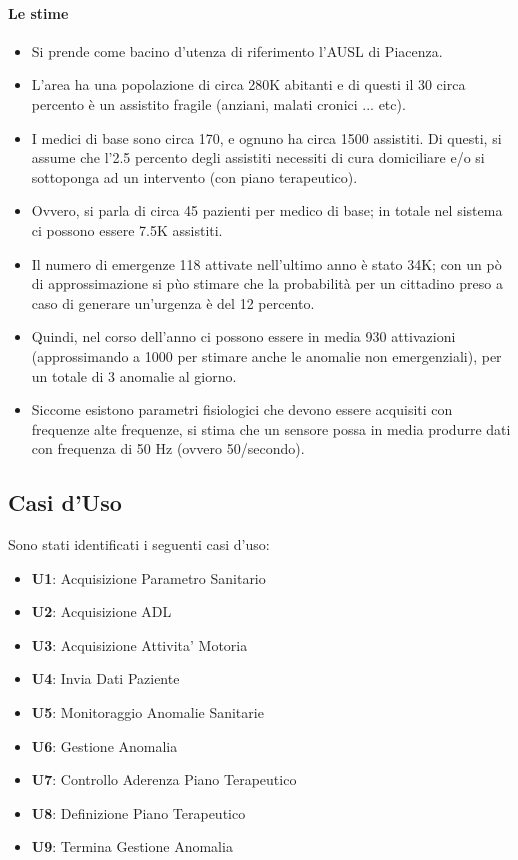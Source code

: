 \documentclass[a4paper,11pt,oneside, table]{article}
\begin{document}
\paragraph{Le stime}
\begin{itemize}
  \item Si prende come bacino d'utenza di riferimento l'AUSL di Piacenza.
  \item L'area ha una popolazione di circa 280K abitanti e di questi il 30 circa percento \`e un assistito fragile (anziani, malati cronici ... etc).
  \item I medici di base sono circa 170, e ognuno ha circa 1500 assistiti. Di questi, si assume che l'2.5 percento degli assistiti necessiti di cura domiciliare e/o si sottoponga ad un intervento (con piano terapeutico).
  \item Ovvero, si parla di circa 45 pazienti per medico di base; in totale nel sistema ci possono essere 7.5K assistiti.
  \item Il numero di emergenze 118 attivate nell'ultimo anno \`e stato 34K; con un p\`o di approssimazione si p\`uo stimare che la probabilit\`a per un cittadino preso a caso di generare un'urgenza \`e del 12 percento.
  \item Quindi, nel corso dell'anno ci possono essere in media 930 attivazioni (approssimando a 1000 per stimare anche le anomalie non emergenziali), per un totale di 3 anomalie al giorno.
  \item Siccome esistono parametri fisiologici che devono essere acquisiti con frequenze alte frequenze, si stima che un sensore possa in media produrre dati con frequenza di 50 Hz (ovvero 50/secondo).
\end{itemize}

\subsection{Casi d'Uso}

Sono stati identificati i seguenti casi d'uso:
\begin{itemize}
  \item \textbf{U1}: Acquisizione Parametro Sanitario
  \item \textbf{U2}: Acquisizione ADL
  \item \textbf{U3}: Acquisizione Attivita' Motoria
  \item \textbf{U4}: Invia Dati Paziente
  \item \textbf{U5}: Monitoraggio Anomalie Sanitarie
  \item \textbf{U6}: Gestione Anomalia
  \item \textbf{U7}: Controllo Aderenza Piano Terapeutico
  \item \textbf{U8}: Definizione Piano Terapeutico
  \item \textbf{U9}: Termina Gestione Anomalia
\end{itemize}
\end{document}

